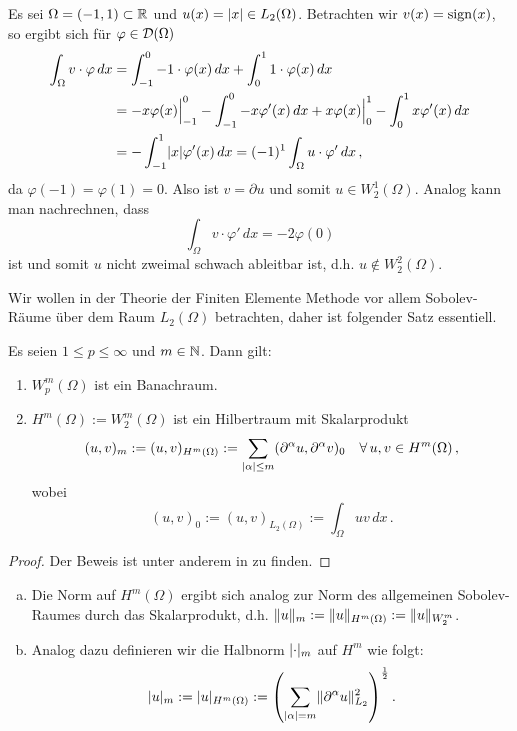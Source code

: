 \begin{bsp}\label{bsp:A.4}
Es sei $\Omega = (-1,1) \subset \mathbb{R}$ und $u (x) = \lvert x\rvert \in L_2(\Omega)$. Betrachten wir $v (x) = \operatorname{sign} (x)$, so ergibt sich für $\varphi \in \mathcal D(\Omega)$
\begin{align*}
	\int_\Omega v \cdot \varphi \, dx & = \int_{-1}^0 -1 \cdot \varphi(x) \, dx + \int_0^1 1\cdot \varphi(x) \, dx  \\
	&= -x\varphi(x)\Big|_{-1}^0 - \int_{-1}^0 -x \varphi'(x) \, dx +  x \varphi(x)\Big|_0^1 -\int_0^1 x \varphi'(x) \, dx \\
	& = - \int_{-1}^1 \lvert x\rvert \varphi'(x) \, dx = (-1)^1 \int_\Omega u \cdot \varphi' \, dx \, ,
\end{align*}
da $\varphi(-1) = \varphi(1) = 0$. Also ist $v = \partial u$ und somit $u \in W^1_2(\Omega)$. Analog kann man nachrechnen, dass 
\[
	\int_\Omega v \cdot \varphi' \, dx = -2\varphi(0)
\]
ist und somit $u$ nicht zweimal schwach ableitbar ist, d.h. $u \not \in W^2_2(\Omega)$.
\end{bsp}

Wir wollen in der Theorie der Finiten Elemente Methode vor allem Sobolev-Räume über dem Raum $L_2(\Omega)$ betrachten, daher ist folgender Satz essentiell.

\begin{satz}\label{satz:A.5}
Es seien $1\le p \le \infty$ und $m \in \mathbb{N}$. Dann gilt:
\begin{enumerate}[\rm (a)]
\item $W_p^m(\Omega)$ ist ein Banachraum.
\item $H^m(\Omega) := W_2^m(\Omega)$ ist ein Hilbertraum mit Skalarprodukt
\[
	(u,v)_m := (u,v)_{H^m(\Omega)} := \sum_{\lvert \alpha\rvert \le m} (\partial^\alpha u,\partial^\alpha v)_0\quad \forall \, u,v \in H^m(\Omega) \, ,
\]
wobei
\[
	(u,v)_0 := (u,v)_{L_2(\Omega)} := \int_\Omega uv \, dx \, .
\]
\end{enumerate}
\end{satz}

\begin{proof}
Der Beweis ist unter anderem in \cite{Walker} zu finden.
\end{proof}

\begin{bem}\label{bem:A.6}
\begin{enumerate}[(a)]
\item Die Norm auf $H^m(\Omega)$ ergibt sich analog zur Norm des allgemeinen Sobolev-Raumes durch das Skalarprodukt, d.h. $\lVert u\rVert_m: = \lVert u\rVert_{H^m(\Omega)} := \lVert u\rVert_{W^m_2}$.
\item Analog dazu definieren wir die Halbnorm $\lvert \cdot\rvert_m$ auf $H^m$ wie folgt:
\[
		\lvert u\rvert_m: = \lvert u\rvert_{H^m(\Omega)} :=  \left(
    \sum_{\lvert \alpha\rvert= m}\lVert \partial^\alpha u\rVert^2_{L_2}
  \right)^{\frac 12}.
\]
\end{enumerate}
\end{bem}

